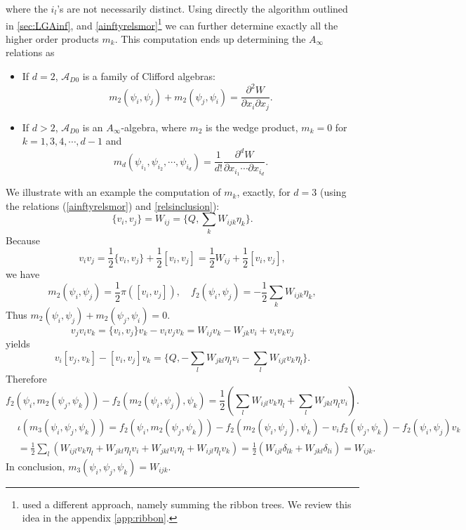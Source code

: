 \documentclass[a4paper,11pt]{article}
\def\cA{\mathcal{A}}
\newcommand{\Af}{{A_\infty}}
\numberwithin{equation}{section}
\begin{document}
where the $i_l$'s are not necessarily distinct. Using directly the algorithm 
outlined in \ref{sec:LGAinf}, 
and \eqref{ainftyrelsmor}\footnote{\cite{ballard2014derived} used a different 
approach, namely summing the ribbon trees. We review this idea in the 
appendix \ref{app:ribbon}.} we can further determine exactly all the 
higher order products $m_{k}$. This computation ends up determining the 
$A_{\infty}$ relations as 
\begin{itemize}
\item If $d=2$, $\cA_{D0}$ is a family of Clifford algebras:
\begin{equation}\label{algrels1}
m_2(\psi_i,\psi_j)+m_2(\psi_j,\psi_i) = \frac{\partial^2 W}{\partial x_i 
\partial x_j}.
\end{equation}
\item If $d>2$, $\cA_{D0}$ is an $\Af$-algebra, where $m_2$ is the wedge 
product, $m_k=0$ for $k=1,3,4,\cdots,d-1$ and
\begin{equation}\label{algrels2}
m_d(\psi_{i_1},\psi_{i_2},\cdots,\psi_{i_d}) = \frac{1}{d!}\frac{\partial^d 
W}{\partial x_{i_1} \cdots \partial x_{i_d}}.
\end{equation}
\end{itemize}
We illustrate with an example the computation of $m_{k}$, exactly, for 
$d=3$ (using the relations (\ref{ainftyrelsmor}) and \eqref{relsinclusion}):
\[
\{ v_i, v_j \} = W_{ij} = \{ Q, \sum_k W_{ijk} \eta_k \}.
\]
Because
\[
v_i v_j = \frac{1}{2} \{ v_i,v_j \} + \frac{1}{2}[v_i,v_j] = 
\frac{1}{2} W_{ij} + \frac{1}{2} [v_i,v_j],
\]
we have
\[
m_2(\psi_i,\psi_j) = \frac{1}{2} \pi \left( [v_i,v_j] \right),\quad 
f_2(\psi_i,\psi_j) = -\frac{1}{2} \sum_k W_{ijk} \eta_k,
\]
Thus $m_2(\psi_i,\psi_j)+m_2(\psi_j,\psi_i)=0$.
\[
v_j v_i v_k = \{ v_i, v_j \} v_k - v_i v_j v_k = W_{ij} 
v_k - W_{jk} v_i + v_i v_k v_j
\]
yields
\[
v_i[v_j,v_k] - [v_i,v_j]v_k = \{ Q, -\sum_l W_{jkl} \eta_l 
v_i - \sum_l W_{ijl} v_k \eta_l \}.
\]
Therefore
\[
f_2(\psi_i,m_2(\psi_j,\psi_k)) - f_2(m_2(\psi_i,\psi_j),\psi_k) = \frac{1}{2} 
(\sum_l W_{ijl} v_k \eta_l + \sum_{l} W_{jkl} \eta_l v_i).
\]
\[
\begin{split}
&\iota(m_3(\psi_i,\psi_j,\psi_k)) = f_2(\psi_i,m_2(\psi_j,\psi_k)) - 
f_2(m_2(\psi_i,\psi_j),\psi_k) - v_i f_2(\psi_j,\psi_k) - f_2(\psi_i,\psi_j) 
v_k \\
&= \frac{1}{2} \sum_l (W_{ijl}v_k\eta_l + W_{jkl}\eta_l v_i + 
W_{jkl}v_i\eta_l + W_{ijl} \eta_l v_k) = \frac{1}{2} (W_{ijl} \delta_{lk} 
+ W_{jkl} \delta_{li}) = W_{ijk}.
\end{split}
\]
In conclusion, $m_3(\psi_i,\psi_j,\psi_k) = W_{ijk}$.
\end{document}
